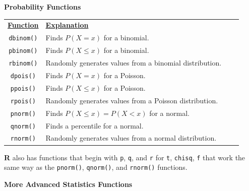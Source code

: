 \documentclass[11pt]{article}
\begin{document}
\vspace{.1in}
\begin{tcolorbox}[width=3.35in, sharp corners=all, colback=white!95!black] %
	{\bf Probability Functions}
\end{tcolorbox}

\begin{tabular}{clcc}
	\underline{\bf Function} & \underline{\bf Explanation}\\
	\texttt{dbinom()} & Finds $P(X=x)$ for a binomial. \\
	\texttt{pbinom()} & Finds $P(X\le x)$ for a binomial. \\
	\texttt{rbinom()} & Randomly generates values from a binomial distribution. \\
	\texttt{dpois()} & Finds $P(X=x)$ for a Poisson. \\
	\texttt{ppois()} & Finds $P(X\le x)$ for a Poisson. \\
	\texttt{rpois()} & Randomly generates values from a Poisson distribution. \\
	\texttt{pnorm()} & Finds $P(X\le x)=P(X<x)$ for a normal.\\
	\texttt{qnorm()} & Finds a percentile for a normal.\\
	\texttt{rnorm()} & Randomly generates values from a normal distribution.\\
\end{tabular}

{\bf R} also has functions that begin with \texttt{p},  \texttt{q}, and  \texttt{r} for  \texttt{t},  \texttt{chisq},  \texttt{f} that work the same way as the \texttt{pnorm()},  \texttt{qnorm()}, and  \texttt{rnorm()} functions.\\

\vspace{.1in}
\begin{tcolorbox}[width=3.35in, sharp corners=all, colback=white!95!black] %
	{\bf More Advanced Statistics Functions}
\end{tcolorbox}
\end{document}
